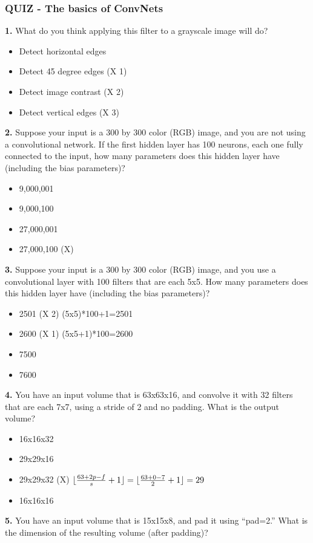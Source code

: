 \subsubsection*{QUIZ - The basics of ConvNets}
\textbf{1.} What do you think applying this filter to a grayscale image will do?
\begin{itemize}
    \item Detect horizontal edges
    \item Detect 45 degree edges (X 1)
    \item Detect image contrast (X 2)
    \item Detect vertical edges (X 3)
\end{itemize}
\textbf{2.} Suppose your input is a 300 by 300 color (RGB) image, and you are not using a convolutional network. If the first hidden layer has 100 neurons, each one fully connected to the input, how many parameters does this hidden layer have (including the bias parameters)?
\begin{itemize}
    \item 9,000,001
    \item 9,000,100
    \item 27,000,001
    \item 27,000,100 (X)
\end{itemize}
\textbf{3.} Suppose your input is a 300 by 300 color (RGB) image, and you use a convolutional layer with 100 filters that are each 5x5. How many parameters does this hidden layer have (including the bias parameters)?
\begin{itemize}
    \item 2501 (X 2) (5x5)*100+1=2501
    \item 2600 (X 1) (5x5+1)*100=2600
    \item 7500
    \item 7600
\end{itemize}
\textbf{4.} You have an input volume that is 63x63x16, and convolve it with 32 filters that are each 7x7, using a stride of 2 and no padding. What is the output volume?
\begin{itemize}
    \item 16x16x32
    \item 29x29x16
    \item 29x29x32 (X) $\lfloor\frac{63+2p-f}{s}+1\rfloor=\lfloor\frac{63+0-7}{2}+1\rfloor=29$
    \item 16x16x16
\end{itemize}
\textbf{5.} You have an input volume that is 15x15x8, and pad it using “pad=2.” What is the dimension of the resulting volume (after padding)?

